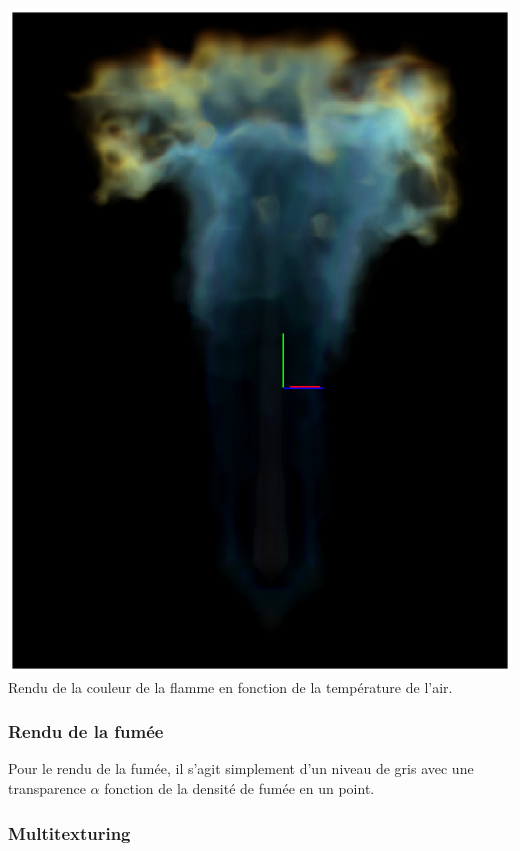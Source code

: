 \documentclass[a4paper,10pt]{article}
\begin{document}
    \begin{center}
	\includegraphics[scale=0.5]{Flamme.ps}\\
	Rendu de la couleur de la flamme en fonction de la température de l'air.\\
    \end{center}
    

\subsubsection{Rendu de la fumée}

	Pour le rendu de la fumée, il s'agit simplement d'un niveau de gris avec une transparence $\alpha$ fonction de la densité de fumée en un point.\\


\subsubsection{Multitexturing}
\end{document}

